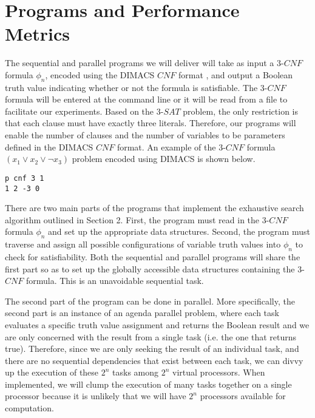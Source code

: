 \documentclass[paper=a4, fontsize=11pt]{scrartcl} %
\begin{document}
\section{Programs and Performance Metrics}
The sequential and parallel programs we will deliver will take as input 
a $3$-$CNF$ formula $\phi_n$, encoded using the DIMACS $CNF$ format \cite{dimacs}, 
and output a Boolean truth value indicating whether or not the 
formula is satisfiable. The $3$-$CNF$ formula will be entered at the command 
line or it will be read from a file to facilitate our experiments. Based on 
the $3$-$SAT$ problem, the only restriction is that each clause must have 
exactly three literals. Therefore, our programs will enable the 
number of clauses and the number of variables 
to be parameters defined in the DIMACS $CNF$ format. An example of the 
$3$-$CNF$ formula $(x_1 \lor x_2 \lor \lnot x_3)$ problem encoded using DIMACS is shown below.
\begin{center}
\begin{lstlisting}[frame=single]
p cnf 3 1
1 2 -3 0
\end{lstlisting}
\end{center}
\vspace{-1em}
There are two main parts of the programs that implement the exhaustive search algorithm outlined
in Section 2. First, the program must read in the $3$-$CNF$ formula $\phi_n$ and set up 
the appropriate data structures. Second, the program must traverse 
and assign all possible configurations of variable truth 
values into $\phi_n$ to check for satisfiability. Both the 
sequential and parallel programs will share the first part so as to set up 
the globally accessible data structures containing the $3$-$CNF$ formula. This is an unavoidable sequential task.

The second part of the program can be done in parallel. More specifically, the 
second part is an instance of an agenda parallel problem, where each 
task evaluates a specific truth value assignment and returns the Boolean result
and we are only concerned with the result from a single task (i.e. the one that returns true). 
Therefore, since we are only seeking the result of an individual task, and
there are no sequential dependencies that exist between each task, we can divvy 
up the execution of these $2^n$ tasks among $2^n$ virtual processors. When 
implemented, we will clump the execution of many tasks together on a single 
processor because it is unlikely that we will have $2^n$ processors available for computation. 
\end{document}
